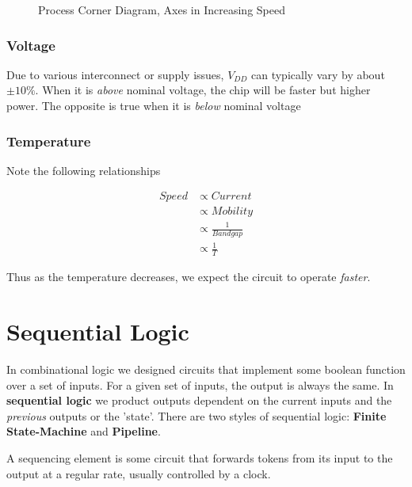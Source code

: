 \documentclass[11pt]{report}
\begin{document}
\begin{figure}[t]
\centering
{}
\caption{Process Corner Diagram, Axes in Increasing Speed}\label{fig:process-corners}
\end{figure}

\subsection{Voltage}
Due to various interconnect or supply issues, $V_{DD}$ can typically vary by about $\pm 10\%$. When it is \textit{above} nominal voltage, the chip will be faster but higher power. The opposite is true when it is \textit{below} nominal voltage

\subsection{Temperature}
Note the following relationships

\begin{align}
	Speed &\propto Current\\
		  &\propto Mobility\\
		  &\propto \frac{1}{Bandgap}\\
		  &\propto \frac{1}{T}
\end{align}

Thus as the temperature decreases, we expect the circuit to operate \textit{faster}.


\chapter{Sequential Logic}\label{sec:sequential-logic}
In combinational logic we designed circuits that implement some boolean function over a set of inputs. For a given set of inputs, the output is always the same. In \textbf{sequential logic} we product outputs dependent on the current inputs and the \textit{previous} outputs or the 'state'. There are two styles of sequential logic: \textbf{Finite State-Machine} and \textbf{Pipeline}.

A sequencing element is some circuit that forwards tokens from its input to the output at a regular rate, usually controlled by a clock.
\end{document}
